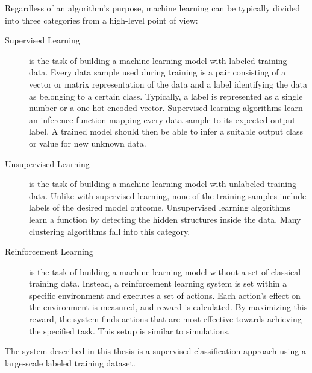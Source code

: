 Regardless of an algorithm's purpose, machine learning can be typically divided into three categories from a high-level point of view:

	\begin{description}
		\item[Supervised Learning] is the task of building a machine learning model with labeled training data. Every data sample used during training is a pair consisting of a vector or matrix representation of the data and a label identifying the data as belonging to a certain class. Typically, a label is represented as a single number or a one-hot-encoded vector. Supervised learning algorithms learn an inference function mapping every data sample to its expected output label. A trained model should then be able to infer a suitable output class or value for new unknown data.

		\item[Unsupervised Learning] is the task of building a machine learning model with unlabeled training data. Unlike with supervised learning, none of the training samples include labels of the desired model outcome. Unsupervised learning algorithms learn a function by detecting the hidden structures inside the data. Many clustering algorithms fall into this category.

		\item[Reinforcement Learning] is the task of building a machine learning model without a set of classical training data. Instead, a reinforcement learning system is set within a specific environment and executes a set of actions. Each action's effect on the environment is measured, and reward is calculated. By maximizing this reward, the system finds actions that are most effective towards achieving the specified task. This setup is similar to simulations.
	\end{description}

The system described in this thesis is a supervised classification approach using a large-scale labeled training dataset.

